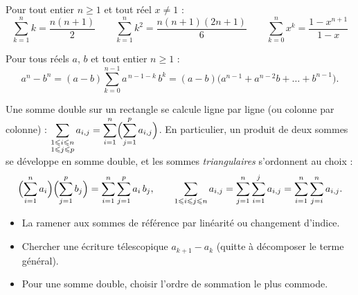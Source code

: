 Pour tout entier $n\geq1$ et tout réel $x\neq1$ :
\[
  \sum_{k=1}^{n}k=\frac{n(n+1)}{2}\qquad
  \sum_{k=1}^{n}k^{2}=\frac{n(n+1)(2n+1)}{6}\qquad
  \sum_{k=0}^{n}x^{k}=\frac{1-x^{n+1}}{1-x}
\]

\begin{propriete}[Factorisation de $a^{n}-b^{n}$]
Pour tous réels $a$, $b$ et tout entier $n\geq1$ :
\[
  a^{n}-b^{n}=(a-b)\sum_{k=0}^{n-1}a^{\,n-1-k}\,b^{k}
  =(a-b)\bigl(a^{n-1}+a^{n-2}b+\dots+b^{n-1}\bigr).
\]
\end{propriete}

\begin{definition}
Une somme double sur un rectangle se calcule ligne par ligne (ou colonne par
colonne) :
$\displaystyle\sum_{\substack{1\leq i\leq n\\ 1\leq j\leq p}}a_{i,j}=\sum_{i=1}^{n}\Bigl(\sum_{j=1}^{p}a_{i,j}\Bigr)$.
En particulier, un produit de deux sommes se développe en somme double, et
les sommes \emph{triangulaires} s'ordonnent au choix :
\[
  \Bigl(\sum_{i=1}^{n}a_i\Bigr)\Bigl(\sum_{j=1}^{p}b_j\Bigr)=\sum_{i=1}^{n}\sum_{j=1}^{p}a_i\,b_j,
  \qquad
  \sum_{1\leq i\leq j\leq n}a_{i,j}=\sum_{j=1}^{n}\sum_{i=1}^{j}a_{i,j}=\sum_{i=1}^{n}\sum_{j=i}^{n}a_{i,j}.
\]
\end{definition}

\begin{savoirfaire}
\begin{itemize}[label={\color{otGreenDark}\textbullet},leftmargin=1.4em,itemsep=0.6mm,topsep=0.5mm]
  \item La ramener aux sommes de référence par linéarité ou changement d'indice.
  \item Chercher une écriture télescopique $a_{k+1}-a_k$ (quitte à décomposer le terme général).
  \item Pour une somme double, choisir l'ordre de sommation le plus commode.
\end{itemize}
\end{savoirfaire}


